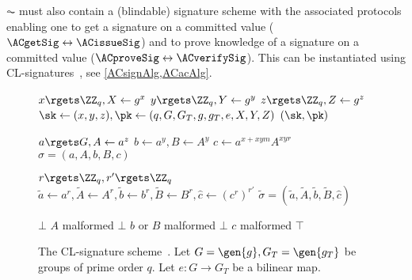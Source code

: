 \(\AC\) must also contain a (blindable) signature scheme with the associated protocols enabling one to get a signature on a committed value (\(\ACgetSig\leftrightarrow \ACissueSig\)) and to prove knowledge of a signature on a committed value (\(\ACproveSig\leftrightarrow \ACverifySig\)).
This can be instantiated using CL-signatures~\cite{CLsignatures}, see 
\cref{ACsignAlg,ACacAlg}.

\begin{figure}
  \small
  \begin{algorithmic}
    \Function{\ACsetup}{}
    \State $x\rgets \ZZ_q, X\gets g^x$
    \State $y\rgets \ZZ_q, Y\gets g^y$
    \State $z\rgets \ZZ_q, Z\gets g^z$
    \State $\sk\gets (x,y,z), \pk\gets (q, G, G_T, g, g_T, e, X, Y, Z)$
    \State \Return $(\sk, \pk)$
    \EndFunction

    \State $a\rgets G, A\gets a^z$
    \State $b\gets a^y, B\gets A^y$
    \State $c\gets a^{x+xym} A^{xyr}$
    \State \Return $\sigma = (a, A, b, B, c)$
    \EndFunction

    \State $r\rgets \ZZ_q, r'\rgets \ZZ_q$
    \State $\tilde a\gets a^r, \tilde A\gets A^r,
      \tilde b\gets b^r, \tilde B\gets B^r,
      \hat c\gets (c^r)^{r'}$
    \State \Return $\tilde \sigma = (\tilde a, \tilde A,
      \tilde b, \tilde B, \hat c)$
    \EndFunction

    \State \Return $\bot$
    \Comment $A$ malformed
    \State \Return $\bot$
    \Comment $b$ or $B$ malformed
    \State \Return $\bot$
    \Comment $c$ malformed
    \EndIf
    \State \Return $\top$
    \EndFunction

  \end{algorithmic}
  \caption{\label{ACsignAlg}%
    The CL-signature scheme~\cite{CLsignatures}.
    Let \(G = \gen{g}, G_T = \gen{g_T}\) be groups of prime order \(q\).
    Let \(e\colon G\to G_T\) be a bilinear map.
  }
\end{figure}

